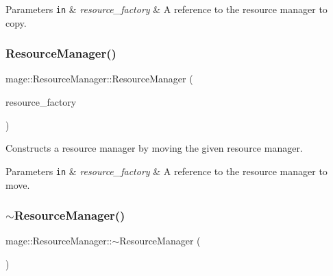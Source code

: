 \begin{DoxyParams}[1]{Parameters}
\mbox{\tt in}  & {\em resource\+\_\+factory} & A reference to the resource manager to copy. \\
\hline
\end{DoxyParams}
\hypertarget{classmage_1_1_resource_manager_a7aa3b08f3edd385b48694ae4b301ebba}{}\label{classmage_1_1_resource_manager_a7aa3b08f3edd385b48694ae4b301ebba} 
\subsubsection{\texorpdfstring{Resource\+Manager()}{ResourceManager()}\hspace{0.1cm}{\footnotesize\ttfamily [3/3]}}
{\footnotesize\ttfamily mage\+::\+Resource\+Manager\+::\+Resource\+Manager (\begin{DoxyParamCaption}\item[{\hyperlink{classmage_1_1_resource_manager}{Resource\+Manager} \&\&}]{resource\+\_\+factory }\end{DoxyParamCaption})\hspace{0.3cm}{\ttfamily [default]}}

Constructs a resource manager by moving the given resource manager.


\begin{DoxyParams}[1]{Parameters}
\mbox{\tt in}  & {\em resource\+\_\+factory} & A reference to the resource manager to move. \\
\hline
\end{DoxyParams}
\hypertarget{classmage_1_1_resource_manager_ad4bed85d3656f90072c5d47f50618add}{}\label{classmage_1_1_resource_manager_ad4bed85d3656f90072c5d47f50618add} 
\subsubsection{\texorpdfstring{$\sim$\+Resource\+Manager()}{~ResourceManager()}}
{\footnotesize\ttfamily mage\+::\+Resource\+Manager\+::$\sim$\+Resource\+Manager (\begin{DoxyParamCaption}{ }\end{DoxyParamCaption})\hspace{0.3cm}{\ttfamily [virtual]}}

